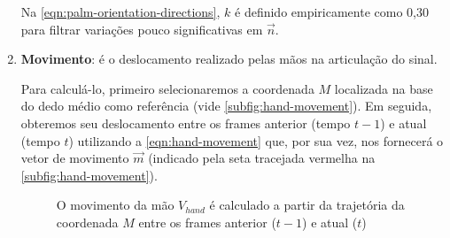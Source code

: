 \begin{enumerate}
          Na \autoref{eqn:palm-orientation-directions}, \(k\) é definido empiricamente como 0,30 para filtrar variações pouco significativas em \(\overrightarrow{n}\).


    \item \textbf{Movimento}: é o deslocamento realizado pelas mãos na articulação do sinal.

          Para calculá-lo, primeiro selecionaremos a coordenada \(M\) localizada na base do dedo médio como referência (vide \autoref{subfig:hand-movement}).
          Em seguida, obteremos seu deslocamento entre os frames anterior (tempo \(t-1\)) e atual (tempo \(t\)) utilizando a \autoref{eqn:hand-movement} que, por sua vez, nos fornecerá o vetor de movimento \(\overrightarrow{m}\) (indicado pela seta tracejada vermelha na \autoref{subfig:hand-movement}).

          \begin{figure}[ht!]
              \centering
              \caption{
                  \textmd{
                      O movimento da mão \(V_{hand}\) é calculado a partir da trajetória da coordenada \(M\) entre os frames anterior (\(t-1\)) e atual (\(t\))
                  }
              }
              \nomefonte{}
              \label{fig:hand-movement-directions}
          \end{figure}


\end{enumerate}
